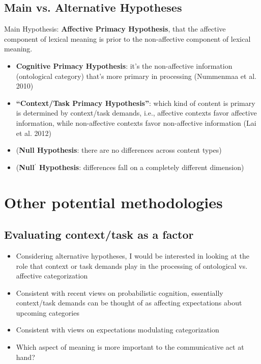 \documentclass[12pt,letterpaper,table,svgnames,dvipsnames]{article}
\begin{document}
\subsection{Main vs. Alternative Hypotheses}

\noindent Main Hypothesis: \textbf{Affective Primacy Hypothesis}, that the affective component of lexical meaning is prior to the non-affective component of lexical meaning.\\

\begin{itemize}
    \item \textbf{Cognitive Primacy Hypothesis}: it's the non-affective information (ontological category) that's more primary in processing (Nummenmaa et al. 2010)\\
    
    \item \textbf{``Context/Task Primacy Hypothesis''}: which kind of content is primary is determined by context/task demands, i.e., affective contexts favor affective information, while non-affective contexts favor non-affective information (Lai et al. 2012)\\
    
    \item (\textbf{Null Hypothesis}: there are no differences across content types)
    \item (\textbf{Null$^\prime$ Hypothesis}: differences fall on a completely different dimension)
\end{itemize}%

\section{Other potential methodologies}

\subsection{Evaluating context/task as a factor}

\begin{itemize}
    \item Considering alternative hypotheses, I would be interested in looking at the role that context or task demands play in the processing of ontological vs. affective categorization 

    \item Consistent with recent views on probabilistic cognition, essentially context/task demands can be thought of as affecting expectations about upcoming categories

    \item Consistent with views on expectations modulating categorization

    \item Which aspect of meaning is more important to the communicative act at hand?
    
\end{itemize}
\end{document}
